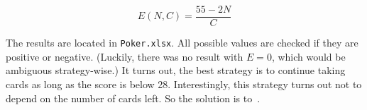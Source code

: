 \documentclass{article}
\begin{document}
\[
E(N,C)=\frac{55-2N}{C}
\]

The results are located in \texttt{Poker.xlsx}.
All possible values are checked if they are positive or negative.
(Luckily, there was no result with $E=0$, which would be ambiguous strategy-wise.)
It turns out, the best strategy is to continue taking cards as long as the score is below 28.
Interestingly, this strategy turns out not to depend on the number of cards left.
So the solution is to
\,.
\end{document}
